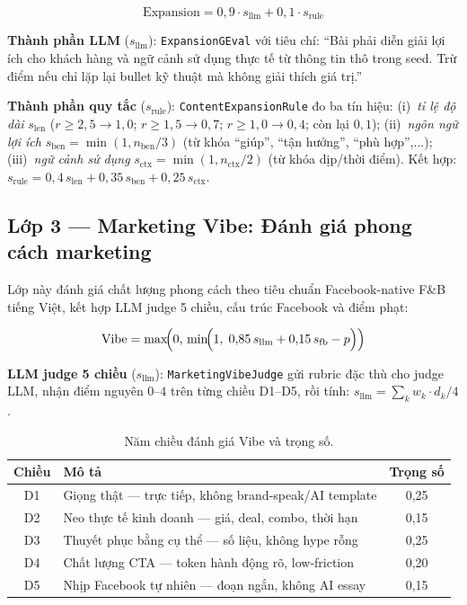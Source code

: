 \begin{equation}
  \text{Expansion} = 0{,}9 \cdot s_{\text{llm}} + 0{,}1 \cdot s_{\text{rule}}
  \label{eq:expansion}
\end{equation}

\textbf{Thành phần LLM} ($s_{\text{llm}}$): \texttt{ExpansionGEval}
với tiêu chí: ``Bài phải diễn giải lợi ích cho khách hàng và ngữ cảnh
sử dụng thực tế từ thông tin thô trong seed. Trừ điểm nếu chỉ lặp lại
bullet kỹ thuật mà không giải thích giá trị.''

\textbf{Thành phần quy tắc} ($s_{\text{rule}}$):
\texttt{ContentExpansionRule} đo ba tín hiệu:
(i)~\emph{tỉ lệ độ dài} $s_{\text{len}}$ ($r \geq 2{,}5 \to 1{,}0$;
$r \geq 1{,}5 \to 0{,}7$; $r \geq 1{,}0 \to 0{,}4$; còn lại $0{,}1$);
(ii)~\emph{ngôn ngữ lợi ích} $s_{\text{ben}} = \min(1, n_{\text{ben}}/3)$
(từ khóa ``giúp'', ``tận hưởng'', ``phù hợp'',...);
(iii)~\emph{ngữ cảnh sử dụng} $s_{\text{ctx}} = \min(1, n_{\text{ctx}}/2)$
(từ khóa dịp/thời điểm). Kết hợp:
$s_{\text{rule}} = 0{,}4\,s_{\text{len}} + 0{,}35\,s_{\text{ben}} +
0{,}25\,s_{\text{ctx}}$.

\subsection{Lớp 3 --- Marketing Vibe: Đánh giá phong cách marketing}
\label{subsec:vibe}

Lớp này đánh giá chất lượng phong cách theo tiêu chuẩn
Facebook-native F\&B tiếng Việt, kết hợp LLM judge 5 chiều,
cấu trúc Facebook và điểm phạt:

\begin{equation}
  \text{Vibe} = \max\!\Bigl(0,\,\min\!\Bigl(1,\;
  0{,}85\,s_{\text{llm}} + 0{,}15\,s_{\text{fb}} - p\Bigr)\Bigr)
  \label{eq:vibe}
\end{equation}

\textbf{LLM judge 5 chiều} ($s_{\text{llm}}$):
\texttt{MarketingVibeJudge} gửi rubric đặc thù cho judge LLM, nhận
điểm nguyên $0$--$4$ trên từng chiều D1--D5, rồi tính:
$s_{\text{llm}} = \sum_k w_k \cdot d_k / 4$.

\begin{table}[h]
  \centering
  \small
  \caption{Năm chiều đánh giá Vibe và trọng số.}
  \label{tab:vibe-dims}
  \begin{tabular}{cp{}c}
    \toprule
    \textbf{Chiều} & \textbf{Mô tả} & \textbf{Trọng số} \\
    \midrule
    D1 & Giọng thật --- trực tiếp, không brand-speak/AI template & 0,25 \\
    D2 & Neo thực tế kinh doanh --- giá, deal, combo, thời hạn & 0,15 \\
    D3 & Thuyết phục bằng cụ thể --- số liệu, không hype rỗng & 0,25 \\
    D4 & Chất lượng CTA --- token hành động rõ, low-friction & 0,20 \\
    D5 & Nhịp Facebook tự nhiên --- đoạn ngắn, không AI essay & 0,15 \\
    \bottomrule
  \end{tabular}
\end{table}

